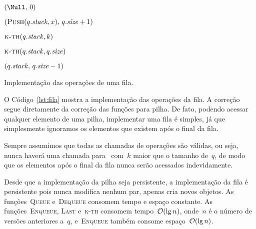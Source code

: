 \documentclass[../../main.tex]{subfiles}
\begin{document}
\begin{algorithm}
\begin{algorithmic}[1]
    \State \Return $(\Null,\,0)$
\EndFunction

    \State \Return $(\Call{Push}{q.\V{stack}, x},\,q.\V{size} + 1)$
\EndFunction

    \State \Return $\Call{k-th}{q.\V{stack}, k}$ 
\EndFunction

    \State \Return $\Call{k-th}{q.\V{stack}, q.\V{size}}$
\EndFunction

    \State \Return $(q.\mathit{stack},\,q.\mathit{size} - 1)$
\EndFunction

\end{algorithmic}
\caption{Implementação das operações de uma fila.} \label{lst:fila}
\end{algorithm}

O Código~\ref{lst:fila} mostra a implementação das operações da fila. A correção segue diretamente da correção das funções para pilha. De fato, podendo acessar qualquer elemento de uma pilha, implementar uma fila é simples, já que simplesmente ignoramos os elementos que existem após o final da fila.

Sempre assumimos que todas as chamadas de operações são válidas, ou seja, nunca haverá uma chamada para~ com~$k$ maior que o tamanho de~$q$, de modo que os elementos após o final da fila nunca serão acessados indevidamente.

Desde que a implementação da pilha seja persistente, a implementação da fila é persistente pois nunca modifica nenhum par, apenas cria novos objetos. As funções~\textsc{Queue} e~\textsc{Dequeue} consomem tempo e espaço constante. As funções~\textsc{Enqueue}, \textsc{Last} e~\textsc{k-th} consomem tempo~$\mathcal{O}(\lg n)$, onde~$n$ é o número de versões anteriores a~$q$, e~\textsc{Enqueue} também consome espaço~$\mathcal{O}(\lg n)$.
\end{document}
